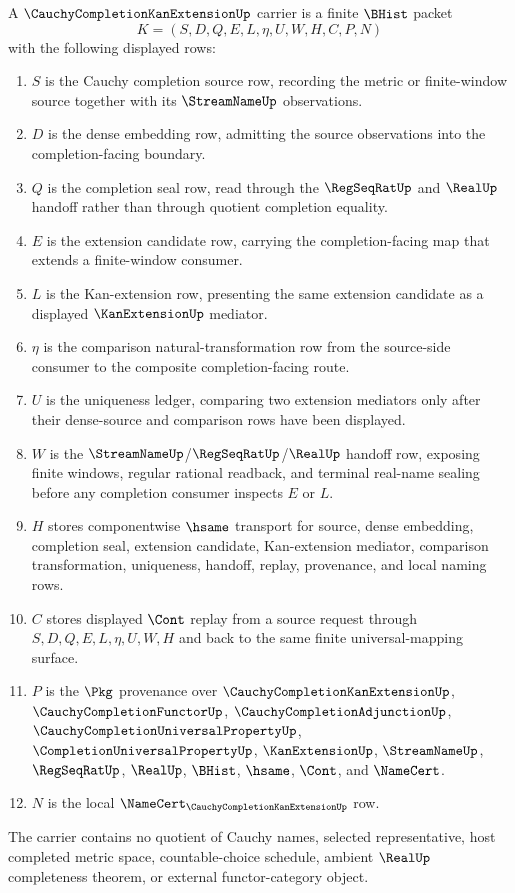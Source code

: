 \begin{definition}
\label{def:cauchy-completion-kan-extension-carrier}
A $\CauchyCompletionKanExtensionUp$ carrier is a finite $\BHist$ packet
$$
K=(S,D,Q,E,L,\eta,U,W,H,C,P,N)
$$
with the following displayed rows:
\begin{enumerate}
\item $S$ is the Cauchy completion source row, recording the metric or finite-window source together with its $\StreamNameUp$ observations.
\item $D$ is the dense embedding row, admitting the source observations into the completion-facing boundary.
\item $Q$ is the completion seal row, read through the $\RegSeqRatUp$ and $\RealUp$ handoff rather than through quotient completion equality.
\item $E$ is the extension candidate row, carrying the completion-facing map that extends a finite-window consumer.
\item $L$ is the Kan-extension row, presenting the same extension candidate as a displayed $\KanExtensionUp$ mediator.
\item $\eta$ is the comparison natural-transformation row from the source-side consumer to the composite completion-facing route.
\item $U$ is the uniqueness ledger, comparing two extension mediators only after their dense-source and comparison rows have been displayed.
\item $W$ is the $\StreamNameUp$/$\RegSeqRatUp$/$\RealUp$ handoff row, exposing finite windows, regular rational readback, and terminal real-name sealing before any completion consumer inspects $E$ or $L$.
\item $H$ stores componentwise $\hsame$ transport for source, dense embedding, completion seal, extension candidate, Kan-extension mediator, comparison transformation, uniqueness, handoff, replay, provenance, and local naming rows.
\item $C$ stores displayed $\Cont$ replay from a source request through $S,D,Q,E,L,\eta,U,W,H$ and back to the same finite universal-mapping surface.
\item $P$ is the $\Pkg$ provenance over $\CauchyCompletionKanExtensionUp$, $\CauchyCompletionFunctorUp$, $\CauchyCompletionAdjunctionUp$, $\CauchyCompletionUniversalPropertyUp$, $\CompletionUniversalPropertyUp$, $\KanExtensionUp$, $\StreamNameUp$, $\RegSeqRatUp$, $\RealUp$, $\BHist$, $\hsame$, $\Cont$, and $\NameCert$.
\item $N$ is the local $\NameCert_{\CauchyCompletionKanExtensionUp}$ row.
\end{enumerate}
The carrier contains no quotient of Cauchy names, selected representative, host completed metric space, countable-choice schedule, ambient $\RealUp$ completeness theorem, or external functor-category object.
\end{definition}

